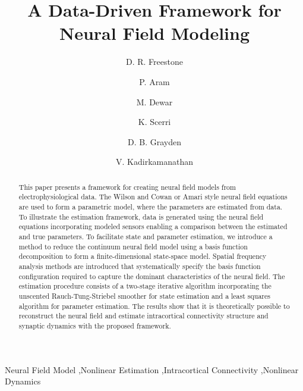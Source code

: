 \documentclass[5p,authoryear]{elsarticle}
\begin{document}
	
	\begin{frontmatter}
\title{A Data-Driven Framework for Neural Field Modeling}

\author[DEEE,BEI,UE]{D. R. Freestone  }
\author[US]{P. Aram} 
\author[UE,CU]{M. Dewar}
\author[UM]{K. Scerri}
\author[DEEE,BEI]{D. B. Grayden}
\author[US]{V. Kadirkamanathan}

\address[DEEE]{Department of Electrical and Electronic Engineering, University of Melbourne, Melbourne, VIC, Australia}
\address[BEI]{The Bionic Ear Institute, East Melbourne, VIC, Australia}
\address[UE]{Institute for Adaptive and Neural Computation, University of Edinburgh, Edinburgh, UK}
\address[US]{Department of Automatic Control and Systems Engineering, University of Sheffield, Sheffield, UK}
\address[CU]{Department of Applied Physics and Applied Mathematics, Columbia University, New York, NY, USA}
\address[UM]{Department of Systems and Control Engineering, University of Malta, Msida, MSD, Malta}


\begin{abstract}
This paper presents a framework for creating neural field models from electrophysiological data. The Wilson and Cowan or Amari style neural field equations are used to form a parametric model, where the parameters are estimated from data. To illustrate the estimation framework, data is generated using the neural field equations incorporating modeled sensors enabling a comparison between the estimated and true parameters. To facilitate state and parameter estimation, we introduce a method to reduce the continuum neural field model using a basis function decomposition to form a finite-dimensional state-space model. Spatial frequency analysis methods are introduced that systematically specify the basis function configuration required to capture the dominant characteristics of the neural field. The estimation procedure consists of a two-stage iterative algorithm incorporating the unscented Rauch-Tung-Striebel smoother for state estimation and a least squares algorithm for parameter estimation. The results show that it is theoretically possible to reconstruct the neural field and estimate intracortical connectivity structure and synaptic dynamics with the proposed framework. %
\end{abstract}

\begin{keyword}
	Neural Field Model \sep Nonlinear Estimation \sep Intracortical Connectivity \sep Nonlinear Dynamics


\end{keyword}

\end{frontmatter}
\end{document}
